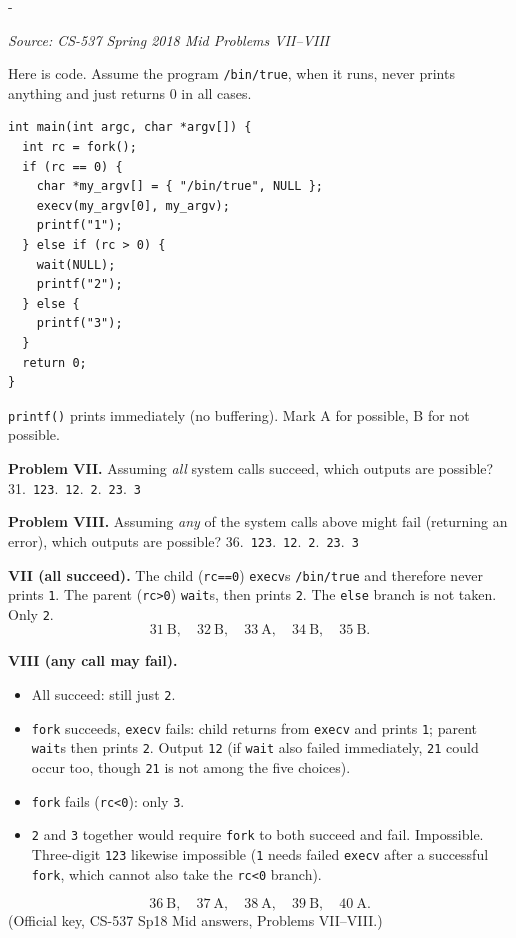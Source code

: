 \documentclass[11pt,a4paper]{article}
\makeatletter
\newcommand{\keepspace}[1]{\par\penalty-100\begingroup
  \setlength{\dimen@}{#1}\dimen@ii\pagegoal\advance\dimen@ii-\pagetotal
  \ifdim\dimen@>\dimen@ii\ifdim\dimen@ii>\z@\vfil\fi\break\fi\endgroup}
\newcounter{qn}[section]
\newenvironment{Qn}[4]{%
  \refstepcounter{qn}\keepspace{7\baselineskip}%
  \begin{tcolorbox}[qboxstyle, title={Q\thesection.\theqn\ \ [#1 \textbar\ #2]\ \ #4}]%
  {\footnotesize\color{g3}\textit{Source: #3}}\par\smallskip%
}{%
  \end{tcolorbox}%
}
\newenvironment{Sol}{%
  \begin{tcolorbox}[sboxstyle, title={Solution}]%
}{%
  \end{tcolorbox}\vspace{0.35em}%
}
\makeatother
\begin{document}
\begin{Qn}{Hard}{Lect 3}{CS-537 Spring 2018 Mid Problems VII--VIII}{\texttt{fork}/\texttt{execv}/\texttt{wait}: success vs.\ any-call-may-fail}
Here is code. Assume the program \texttt{/bin/true}, when it runs, never prints anything and just returns 0 in all cases.
\begin{lstlisting}[numbers=none]
int main(int argc, char *argv[]) {
  int rc = fork();
  if (rc == 0) {
    char *my_argv[] = { "/bin/true", NULL };
    execv(my_argv[0], my_argv);
    printf("1");
  } else if (rc > 0) {
    wait(NULL);
    printf("2");
  } else {
    printf("3");
  }
  return 0;
}
\end{lstlisting}
\texttt{printf()} prints immediately (no buffering). Mark A for possible, B for not possible.

\textbf{Problem VII.} Assuming \emph{all} system calls succeed, which outputs are possible?
31.\ \texttt{123}.\ \texttt{12}.\ \texttt{2}.\ \texttt{23}.\ \texttt{3}

\textbf{Problem VIII.} Assuming \emph{any} of the system calls above might fail (returning an error), which outputs are possible?
36.\ \texttt{123}.\ \texttt{12}.\ \texttt{2}.\ \texttt{23}.\ \texttt{3}
\end{Qn}
\begin{Sol}
\textbf{VII (all succeed).} The child (\texttt{rc==0}) \texttt{execv}s \texttt{/bin/true} and therefore never prints \texttt{1}. The parent (\texttt{rc>0}) \texttt{wait}s, then prints \texttt{2}. The \texttt{else} branch is not taken. Only \texttt{2}.
\[
31\ \mathrm{B},\quad 32\ \mathrm{B},\quad 33\ \mathrm{A},\quad 34\ \mathrm{B},\quad 35\ \mathrm{B}.
\]

\textbf{VIII (any call may fail).}
\begin{itemize}
  \item All succeed: still just \texttt{2}.
  \item \texttt{fork} succeeds, \texttt{execv} fails: child returns from \texttt{execv} and prints \texttt{1}; parent \texttt{wait}s then prints \texttt{2}. Output \texttt{12} (if \texttt{wait} also failed immediately, \texttt{21} could occur too, though \texttt{21} is not among the five choices).
  \item \texttt{fork} fails (\texttt{rc<0}): only \texttt{3}.
  \item \texttt{2} and \texttt{3} together would require \texttt{fork} to both succeed and fail. Impossible. Three-digit \texttt{123} likewise impossible (\texttt{1} needs failed \texttt{execv} after a successful \texttt{fork}, which cannot also take the \texttt{rc<0} branch).
\end{itemize}
\[
36\ \mathrm{B},\quad 37\ \mathrm{A},\quad 38\ \mathrm{A},\quad 39\ \mathrm{B},\quad 40\ \mathrm{A}.
\]
(Official key, CS-537 Sp18 Mid answers, Problems VII--VIII.)
\end{Sol}
\end{document}
